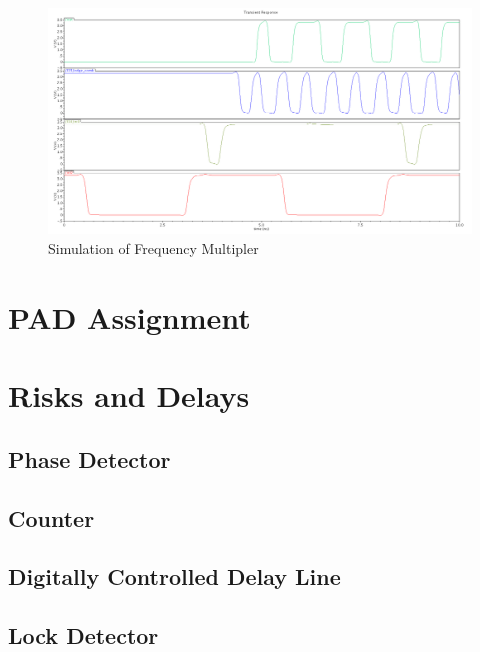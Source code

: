 \documentclass[a4paper,12pt]{article} \usepackage{graphicx}
\begin{document}
\begin{figure}[p]
        \centering
        \includegraphics[width=\textwidth]{../Bilder/freq_mult_signals.png}
        \caption{Simulation of Frequency Multipler}
        \label{fig:freq_mult_signals}
\end{figure}

\section{PAD Assignment} %
\section{Risks and Delays}
\subsection{Phase Detector}
\subsection{Counter}
\subsection{Digitally Controlled Delay Line}
\subsection{Lock Detector}
\end{document}
